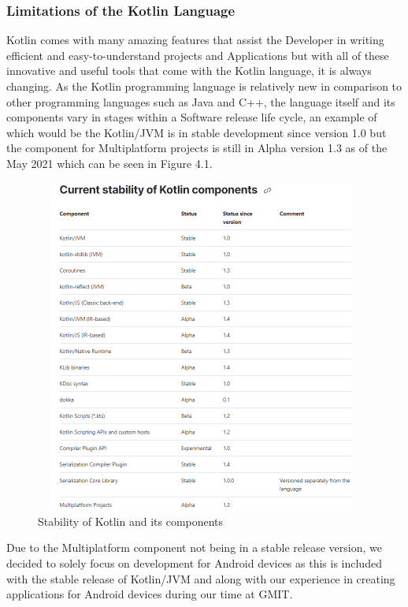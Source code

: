 \subsubsection{Limitations of the Kotlin Language}
Kotlin comes with many amazing features that assist the Developer in writing efficient and easy-to-understand projects and Applications but with all of these innovative and useful tools that come with the Kotlin language, it is always changing. As the Kotlin programming language is relatively new in comparison to other programming languages such as Java and C++, the language itself and its components vary in stages within a Software release life cycle, an example of which would be the Kotlin/JVM is in stable development since version 1.0 but the component for Multiplatform projects is still in Alpha version 1.3 as of the May 2021 which can be seen in Figure 4.1.\cite{ref2}
\begin{figure}[H]
    \centering
    \includegraphics[width=11cm,height = 11cm]{img/KotlinStability.PNG}
    \caption{Stability of Kotlin and its components}
    \label{fig:Stability of Kotlin and its components}
\end{figure}
Due to the Multiplatform component not being in a stable release version, we decided to solely focus on development for Android devices as this is included with the stable release of Kotlin/JVM and along with our \newline experience in creating applications for Android devices during our time at GMIT.
\newline
